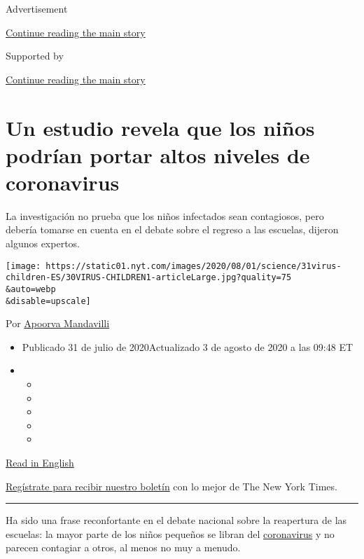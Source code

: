 Advertisement

\protect\hyperlink{after-top}{Continue reading the main story}

Supported by

\protect\hyperlink{after-sponsor}{Continue reading the main story}

\hypertarget{un-estudio-revela-que-los-niuxf1os-podruxedan-portar-altos-niveles-de-coronavirus}{%
\section{Un estudio revela que los niños podrían portar altos niveles de
coronavirus}\label{un-estudio-revela-que-los-niuxf1os-podruxedan-portar-altos-niveles-de-coronavirus}}

La investigación no prueba que los niños infectados sean contagiosos,
pero debería tomarse en cuenta en el debate sobre el regreso a las
escuelas, dijeron algunos expertos.

\texttt{[image: https://static01.nyt.com/images/2020/08/01/science/31virus-children-ES/30VIRUS-CHILDREN1-articleLarge.jpg?quality=75\\\&auto=webp\\\&disable=upscale]}

Por \href{https://www.nytimes.com/by/apoorva-mandavilli}{Apoorva
Mandavilli}

\begin{itemize}
\item
  Publicado 31 de julio de 2020Actualizado 3 de agosto de 2020 a las
  09:48 ET
\item
  \begin{itemize}
  \item
  \item
  \item
  \item
  \item
  \end{itemize}
\end{itemize}

\href{https://www.nytimes.com/2020/07/30/health/coronavirus-children.html}{Read
in English}

\href{https://www.nytimes.com/newsletters/el-times}{Regístrate para
recibir nuestro boletín} con lo mejor de The New York Times.

\begin{center}\rule{0.5\linewidth}{\linethickness}\end{center}

Ha sido una frase reconfortante en el debate nacional sobre la
reapertura de las escuelas: la mayor parte de los niños pequeños se
libran del
\href{https://www.nytimes.com/es/interactive/2020/espanol/mundo/coronavirus-en-estados-unidos.html}{coronavirus}
y no parecen contagiar a otros, al menos no muy a menudo.

